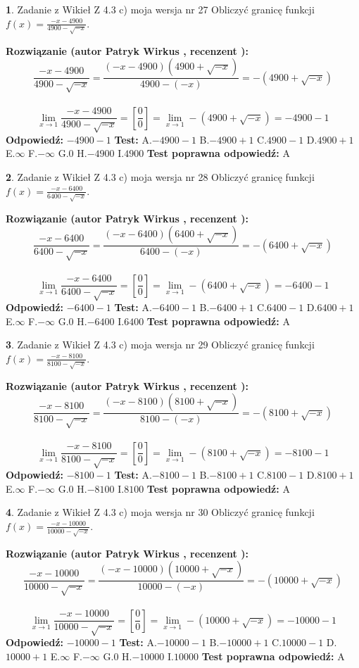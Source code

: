 \documentclass[12pt, a4paper]{article}
\theoremstyle{definition} %
\newtheorem{zad}{}
\newcommand{\zadStart}[1]{\begin{zad}#1\newline}
\newcommand{\zadStop}{\end{zad}}
\newcommand{\rozwStart}[2]{\noindent \textbf{Rozwiązanie (autor #1 , recenzent #2): }\newline}
\newcommand{\rozwStop}{\newline}
\newcommand{\odpStart}{\noindent \textbf{Odpowiedź:}\newline}
\newcommand{\odpStop}{\newline}
\newcommand{\testStart}{\noindent \textbf{Test:}\newline}
\newcommand{\testStop}{\newline}
\newcommand{\kluczStart}{\noindent \textbf{Test poprawna odpowiedź:}\newline}
\newcommand{\kluczStop}{\newline}
\begin{document}
\zadStart{Zadanie z Wikieł Z 4.3 c) moja wersja nr 27}
Obliczyć granicę funkcji $f(x)=\frac{-x-4900}{4900-\sqrt{-x}}$.
\zadStop
\rozwStart{Patryk Wirkus}{}
$$\frac{-x-4900}{4900-\sqrt{-x}}=\frac{(-x-4900)(4900+\sqrt{-x})}{4900-(-x)}=-(4900+\sqrt{-x})$$
\\
$$\lim\limits_{x\to1}\frac{-x-4900}{4900-\sqrt{-x}}=[\frac{0}{0}]=\lim\limits_{x\to1}-(4900+\sqrt{-x}) =-4900-1$$
\rozwStop
\odpStart
$-4900-1$
\odpStop
\testStart
A.$-4900-1$
B.$-4900+1$
C.$4900-1$
D.$4900+1$
E.$\infty$
F.$-\infty$
G.$0$
H.$-4900$
I.$4900$
\testStop
\kluczStart
A
\kluczStop



\zadStart{Zadanie z Wikieł Z 4.3 c) moja wersja nr 28}
Obliczyć granicę funkcji $f(x)=\frac{-x-6400}{6400-\sqrt{-x}}$.
\zadStop
\rozwStart{Patryk Wirkus}{}
$$\frac{-x-6400}{6400-\sqrt{-x}}=\frac{(-x-6400)(6400+\sqrt{-x})}{6400-(-x)}=-(6400+\sqrt{-x})$$
\\
$$\lim\limits_{x\to1}\frac{-x-6400}{6400-\sqrt{-x}}=[\frac{0}{0}]=\lim\limits_{x\to1}-(6400+\sqrt{-x}) =-6400-1$$
\rozwStop
\odpStart
$-6400-1$
\odpStop
\testStart
A.$-6400-1$
B.$-6400+1$
C.$6400-1$
D.$6400+1$
E.$\infty$
F.$-\infty$
G.$0$
H.$-6400$
I.$6400$
\testStop
\kluczStart
A
\kluczStop



\zadStart{Zadanie z Wikieł Z 4.3 c) moja wersja nr 29}
Obliczyć granicę funkcji $f(x)=\frac{-x-8100}{8100-\sqrt{-x}}$.
\zadStop
\rozwStart{Patryk Wirkus}{}
$$\frac{-x-8100}{8100-\sqrt{-x}}=\frac{(-x-8100)(8100+\sqrt{-x})}{8100-(-x)}=-(8100+\sqrt{-x})$$
\\
$$\lim\limits_{x\to1}\frac{-x-8100}{8100-\sqrt{-x}}=[\frac{0}{0}]=\lim\limits_{x\to1}-(8100+\sqrt{-x}) =-8100-1$$
\rozwStop
\odpStart
$-8100-1$
\odpStop
\testStart
A.$-8100-1$
B.$-8100+1$
C.$8100-1$
D.$8100+1$
E.$\infty$
F.$-\infty$
G.$0$
H.$-8100$
I.$8100$
\testStop
\kluczStart
A
\kluczStop



\zadStart{Zadanie z Wikieł Z 4.3 c) moja wersja nr 30}
Obliczyć granicę funkcji $f(x)=\frac{-x-10000}{10000-\sqrt{-x}}$.
\zadStop
\rozwStart{Patryk Wirkus}{}
$$\frac{-x-10000}{10000-\sqrt{-x}}=\frac{(-x-10000)(10000+\sqrt{-x})}{10000-(-x)}=-(10000+\sqrt{-x})$$
\\
$$\lim\limits_{x\to1}\frac{-x-10000}{10000-\sqrt{-x}}=[\frac{0}{0}]=\lim\limits_{x\to1}-(10000+\sqrt{-x}) =-10000-1$$
\rozwStop
\odpStart
$-10000-1$
\odpStop
\testStart
A.$-10000-1$
B.$-10000+1$
C.$10000-1$
D.$10000+1$
E.$\infty$
F.$-\infty$
G.$0$
H.$-10000$
I.$10000$
\testStop
\kluczStart
A
\kluczStop
\end{document}
